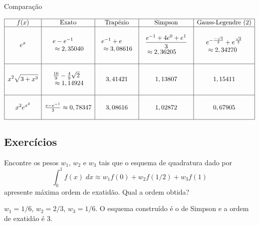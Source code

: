 \begin{ex} Comparação
  \begin{small}
$$
\begin{array}{|c|c|c|c|c|}
\hline
f(x)&\hbox{Exato}&\hbox{Trapézio} &\hbox{Simpson} & \hbox{Gauss-Legendre (2)}\\
\hline
&&&&\\
\displaystyle e^{x}&\displaystyle \begin{array}{l}e-e^{-1}\\~\approx 2,35040\end{array}  & \displaystyle \begin{array}{l}e^{-1}+e \\ ~\approx 3,08616 \end{array}& \begin{array}{l}\displaystyle \frac{e^{-1}+4e^{0}+e^{1}}{3}\\ ~\approx  2,36205\end{array} & \begin{array}{l}\displaystyle e^{-\frac{-\sqrt{3}}{3}}+e^{\frac{\sqrt{3}}{3}}\\ ~\approx   2,34270\end{array}\\
&&&&\\
 \hline
&&&&\\
\displaystyle x^2\sqrt{3+x^3}& \begin{array}{l}\frac{16}{9}-\frac{4}{9}\sqrt{2}\\~\approx 1,14924\end{array} & 3,41421  & 1,13807 & 1,15411\\
&&&&\\
 \hline
&&&&\\
  \displaystyle x^2e^{x^3}&\frac{e-e^{-1}}{3}\approx 0,78347 & 3,08616     & 1,02872  & 0,67905\\
&&&&\\
 \hline
    \end{array}
$$    
  \end{small}
\end{ex}

\subsection*{Exercícios}

\begin{exer}
Encontre os pesos $w_1$, $w_2$ e $w_3$ tais que o esquema de quadratura dado por
$$\int_{0}^{1}f(x)\;dx\approx w_1f(0)+w_2f(1/2)+w_3 f(1)$$
apresente máxima ordem de exatidão. Qual a ordem obtida?
\end{exer}
\begin{resp}
  
 $w_1=1/6$, $w_2=2/3$, $w_3=1/6$. O esquema construído é o de Simpson e a ordem de exatidão é 3.   
  
\end{resp}

